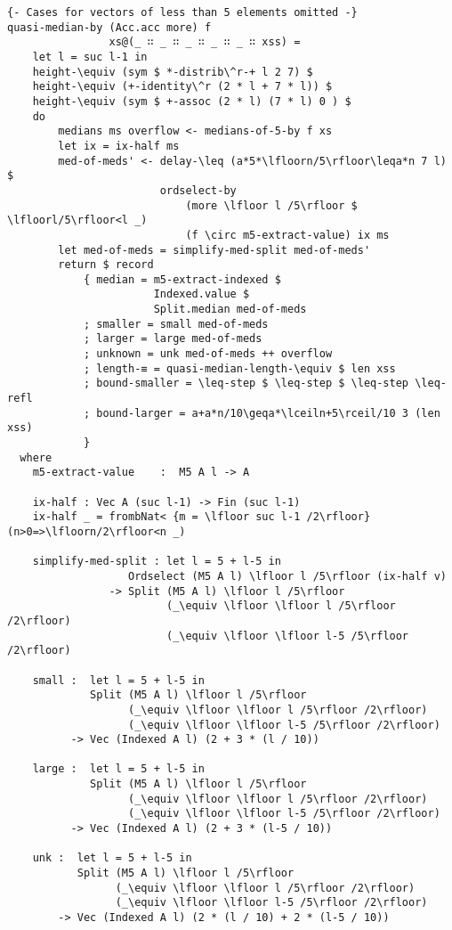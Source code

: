 \newpage
\begin{lstlisting}[caption={Quasi-median},label={lst:median:quasimedian}]
{- Cases for vectors of less than 5 elements omitted -}
quasi-median-by (Acc.acc more) f
                xs@(_ ∷ _ ∷ _ ∷ _ ∷ _ ∷ xss) =
    let l = suc l-1 in
    height-\equiv (sym $ *-distrib\^r-+ l 2 7) $
    height-\equiv (+-identity\^r (2 * l + 7 * l)) $
    height-\equiv (sym $ +-assoc (2 * l) (7 * l) 0 ) $
    do
        medians ms overflow <- medians-of-5-by f xs
        let ix = ix-half ms
        med-of-meds' <- delay-\leq (a*5*\lfloorn/5\rfloor\leqa*n 7 l) $
                        ordselect-by
                            (more \lfloor l /5\rfloor $ \lfloorl/5\rfloor<l _)
                            (f \circ m5-extract-value) ix ms
        let med-of-meds = simplify-med-split med-of-meds'
        return $ record
            { median = m5-extract-indexed $
                       Indexed.value $
                       Split.median med-of-meds
            ; smaller = small med-of-meds
            ; larger = large med-of-meds
            ; unknown = unk med-of-meds ++ overflow
            ; length-≡ = quasi-median-length-\equiv $ len xss
            ; bound-smaller = \leq-step $ \leq-step $ \leq-step \leq-refl
            ; bound-larger = a+a*n/10\geqa*\lceiln+5\rceil/10 3 (len xss)
            }
  where
    m5-extract-value    :  M5 A l -> A

    ix-half : Vec A (suc l-1) -> Fin (suc l-1)
    ix-half _ = frombNat< {m = \lfloor suc l-1 /2\rfloor} (n>0=>\lfloorn/2\rfloor<n _)

    simplify-med-split : let l = 5 + l-5 in
                   Ordselect (M5 A l) \lfloor l /5\rfloor (ix-half v)
                -> Split (M5 A l) \lfloor l /5\rfloor
                         (_\equiv \lfloor \lfloor l /5\rfloor /2\rfloor)
                         (_\equiv \lfloor \lfloor l-5 /5\rfloor /2\rfloor)

    small :  let l = 5 + l-5 in
             Split (M5 A l) \lfloor l /5\rfloor
                   (_\equiv \lfloor \lfloor l /5\rfloor /2\rfloor)
                   (_\equiv \lfloor \lfloor l-5 /5\rfloor /2\rfloor)
          -> Vec (Indexed A l) (2 + 3 * (l / 10))

    large :  let l = 5 + l-5 in
             Split (M5 A l) \lfloor l /5\rfloor
                   (_\equiv \lfloor \lfloor l /5\rfloor /2\rfloor)
                   (_\equiv \lfloor \lfloor l-5 /5\rfloor /2\rfloor)
          -> Vec (Indexed A l) (2 + 3 * (l-5 / 10))

    unk :  let l = 5 + l-5 in
           Split (M5 A l) \lfloor l /5\rfloor
                 (_\equiv \lfloor \lfloor l /5\rfloor /2\rfloor)
                 (_\equiv \lfloor \lfloor l-5 /5\rfloor /2\rfloor)
        -> Vec (Indexed A l) (2 * (l / 10) + 2 * (l-5 / 10))
\end{lstlisting}

